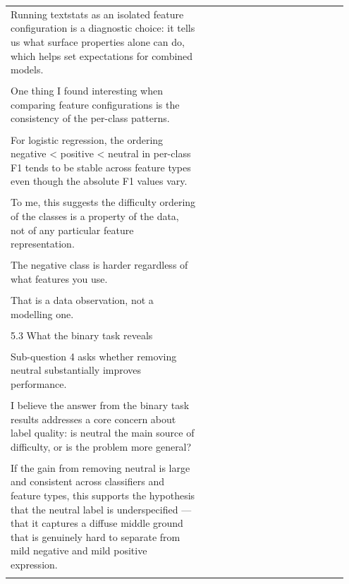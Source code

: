 \documentclass[11pt]{article}
\begin{document}
\begin{longtable}{|p{0.55\linewidth}|p{0.40\linewidth}|}
\hline
\rule{0pt}{3.5cm} & \\
\hline
Running textstats as an isolated feature configuration is a diagnostic choice: it tells us what surface properties alone can do, which helps set expectations for combined models. & \\[2pt]
\hline
\rule{0pt}{3.5cm} & \\
\hline
One thing I found interesting when comparing feature configurations is the consistency of the per-class patterns. & \\[2pt]
\hline
\rule{0pt}{3.5cm} & \\
\hline
For logistic regression, the ordering negative < positive < neutral in per-class F1 tends to be stable across feature types even though the absolute F1 values vary. & \\[2pt]
\hline
\rule{0pt}{3.5cm} & \\
\hline
To me, this suggests the difficulty ordering of the classes is a property of the data, not of any particular feature representation. & \\[2pt]
\hline
\rule{0pt}{3.5cm} & \\
\hline
The negative class is harder regardless of what features you use. & \\[2pt]
\hline
\rule{0pt}{3.5cm} & \\
\hline
That is a data observation, not a modelling one. & \\[2pt]
\hline
\rule{0pt}{3.5cm} & \\
\hline
5.3 What the binary task reveals & \\[2pt]
\hline
\rule{0pt}{3.5cm} & \\
\hline
Sub-question 4 asks whether removing neutral substantially improves performance. & \\[2pt]
\hline
\rule{0pt}{3.5cm} & \\
\hline
I believe the answer from the binary task results addresses a core concern about label quality: is neutral the main source of difficulty, or is the problem more general? & \\[2pt]
\hline
\rule{0pt}{3.5cm} & \\
\hline
If the gain from removing neutral is large and consistent across classifiers and feature types, this supports the hypothesis that the neutral label is underspecified --- that it captures a diffuse middle ground that is genuinely hard to separate from mild negative and mild positive expression. & \\[2pt]
\hline
\rule{0pt}{3.5cm} & \\

\end{longtable}
\end{document}
